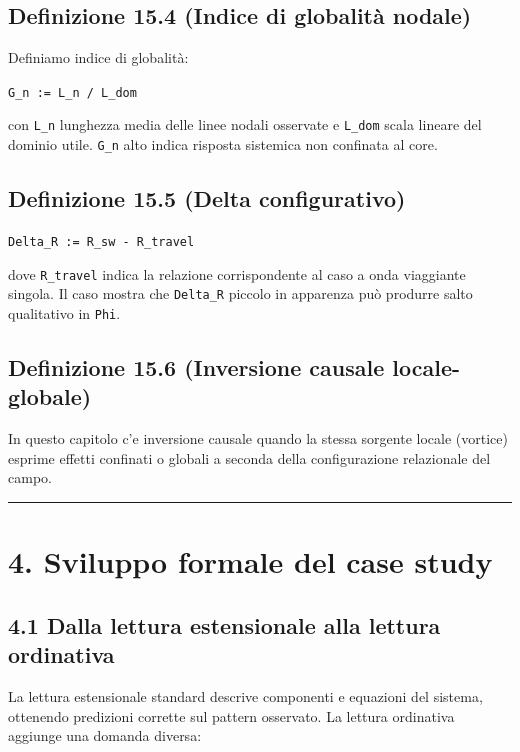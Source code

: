 \subsection{Definizione 15.4 (Indice di globalità nodale)}

Definiamo indice di globalità:

\texttt{G\_n\ :=\ L\_n\ /\ L\_dom}

con \texttt{L\_n} lunghezza media delle linee nodali osservate e \texttt{L\_dom} scala lineare del dominio utile. \texttt{G\_n} alto indica risposta sistemica non confinata al core.

\subsection{Definizione 15.5 (Delta configurativo)}

\texttt{Delta\_R\ :=\ R\_sw\ -\ R\_travel}

dove \texttt{R\_travel} indica la relazione corrispondente al caso a onda viaggiante singola. Il caso mostra che \texttt{Delta\_R} piccolo in apparenza può produrre salto qualitativo in \texttt{Phi}.

\subsection{Definizione 15.6 (Inversione causale locale-globale)}

In questo capitolo c'e inversione causale quando la stessa sorgente locale (vortice) esprime effetti confinati o globali a seconda della configurazione relazionale del campo.

\begin{center}\rule{0.5\linewidth}{0.5pt}\end{center}

\section{4. Sviluppo formale del case study}

\subsection{4.1 Dalla lettura estensionale alla lettura ordinativa}

La lettura estensionale standard descrive componenti e equazioni del sistema, ottenendo predizioni corrette sul pattern osservato. La lettura ordinativa aggiunge una domanda diversa:

